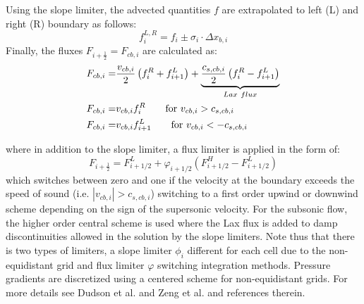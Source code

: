 \documentclass[amsmath,amssymb,a4]{revtex4-2}
\begin{document}
 Using the slope limiter, the advected quantities $f$ are extrapolated to left (L) and right (R) boundary as follows:
 \begin{equation}
  f_{i}^{L,R} =   f_{i} \pm \sigma_i \cdot \Delta x_{b,i}
 \end{equation}
 Finally, the fluxes $F_{i+\frac{1}{2}} =  F_{cb,i}$ are calculated as:
 \begin{eqnarray}
     F_{cb,i} =& \frac{v_{cb,i}}{2} \left(f_{i}^{R} + f_{i+1}^{L} \right) + \underbrace{\frac{c_{s,cb,i}}{2} \left(f_{i}^{R} - f_{i+1}^{L} \right)}_{Lax ~flux} \\
      F_{cb,i} =& v_{cb,i}f_{i}^{R}\quad \quad \hbox{for $v_{cb,i}> c_{s,cb,i}$}\\
      F_{cb,i} =& v_{cb,i}f_{i+1}^{L}\quad \quad \hbox{for $v_{cb,i}< -c_{s,cb,i}$}
 \end{eqnarray}

where in addition to the slope limiter, a flux limiter is applied in the form of:
\begin{equation}
F_{i+\frac{1}{2}}=F_{i+1 / 2}^L+\varphi_{i+1 / 2}\left(F_{i+1 / 2}^H-F_{i+1 / 2}^L\right)
\end{equation}
which switches between zero and one if the velocity at the boundary exceeds the speed of sound (i.e. $|v_{cb,i}| > c_{s,cb,i} $) switching to a first order upwind or downwind scheme depending on the sign of the supersonic velocity.
For the subsonic flow, the higher order central scheme is used where the Lax flux is added to damp discontinuities allowed in the solution by the slope limiters. Note thus that there is two types of limiters, a slope limiter $\phi_{i}$ different for each cell due to the non-equidistant grid and flux limiter $\varphi$ switching integration methods. Pressure gradients are discretized using a centered scheme for non-equidistant grids. For more details see Dudson et al. and Zeng et al. \cite{dudson2019,zeng2013} and references therein.
     
\end{document}
